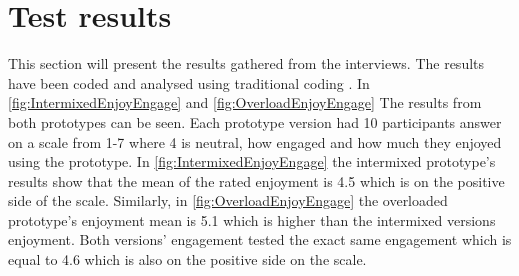 \section{Test results}
This section will present the results gathered from the interviews. The results have been coded and analysed using traditional coding \cite{bjoernerBog}. In \autoref{fig:IntermixedEnjoyEngage} and \autoref{fig:OverloadEnjoyEngage} The results from both prototypes can be seen. Each prototype version had 10 participants answer on a scale from 1-7 where 4 is neutral, how engaged and how much they enjoyed using the prototype. In \autoref{fig:IntermixedEnjoyEngage} the intermixed prototype's results show that the mean of the rated enjoyment is 4.5 which is on the positive side of the scale. Similarly, in  \autoref{fig:OverloadEnjoyEngage} the overloaded prototype's enjoyment mean is 5.1 which is higher than the intermixed versions enjoyment. Both versions' engagement tested the exact same engagement which is equal to 4.6 which is also on the positive side on the scale.

